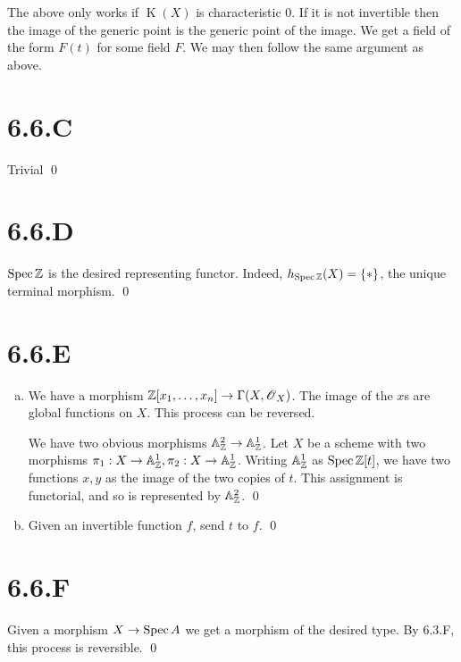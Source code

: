 \documentclass{article}
\begin{document}
The above only works if $\operatorname{K}(X)$ is characteristic 0. If it is not invertible then the image of the generic point is the generic point of the image. We get a field of the form $F(t)$ for some field $F$. We may then follow the same argument as above.

\section{6.6.C}
Trivial \qed

\section{6.6.D}
$\operatorname{Spec} \mathbb{Z}$ is the desired representing functor. Indeed, $h_{\operatorname{Spec} \mathbb{Z}}(X)=\{*\}$, the unique terminal morphism. \qed

\section{6.6.E}
\begin{enumerate}[a.]
    \item We have a morphism $\mathbb{Z}[x_1, \dots, x_n] \to \Gamma(X, \operatorname{\mathscr{O}}_X)$. The image of the $x$s are global functions on $X$. This process can be reversed.

          We have two obvious morphisms $\mathbb{A}^2_{\mathbb{Z}} \to \mathbb{A}^1_{\mathbb{Z}}$. Let $X$ be a scheme with two morphisms $\pi_1: X \to \mathbb{A}^1_{\mathbb{Z}}, \pi_2: X \to \mathbb{A}^1_{\mathbb{Z}}$. Writing $\mathbb{A}^1_{\mathbb{Z}}$ as $\operatorname{Spec} \mathbb{Z}[t]$, we have two functions $x, y$ as the image of the two copies of $t$. This assignment is functorial, and so is represented by $\mathbb{A}^2_{\mathbb{Z}}$. \qed
    \item Given an invertible function $f$, send $t$ to $f$. \qed
\end{enumerate}

\section{6.6.F}
Given a morphism $X \to \operatorname{Spec} A$ we get a morphism of the desired type. By 6.3.F, this process is reversible. \qed
\end{document}
